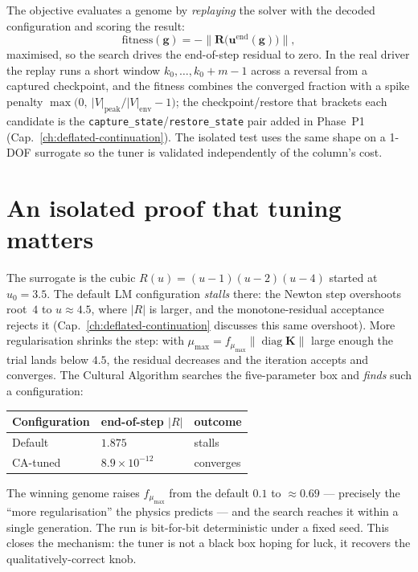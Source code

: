 The objective evaluates a genome by \emph{replaying} the solver with the
decoded configuration and scoring the result:
\[
  \text{fitness}(\mathbf{g})
  = -\bigl\lVert\mathbf{R}\bigl(\mathbf{u}^{\text{end}}(\mathbf{g})\bigr)\bigr\rVert,
\]
maximised, so the search drives the end-of-step residual to zero. In the
real driver the replay runs a short window \(k_0,\dots,k_0{+}m{-}1\) across
a reversal from a captured checkpoint, and the fitness combines the
converged fraction with a spike penalty
\(\max\!\bigl(0,\ |V|_{\text{peak}}/|V|_{\text{env}}-1\bigr)\); the
checkpoint/restore that brackets each candidate is the
\texttt{capture\_state}/\texttt{restore\_state} pair added in Phase~P1
(Cap.~\ref{ch:deflated-continuation}). The isolated test uses the same
shape on a 1-DOF surrogate so the tuner is validated independently of the
column's cost.

\section{An isolated proof that tuning matters}

The surrogate is the cubic \(R(u)=(u-1)(u-2)(u-4)\) started at
\(u_0=3.5\). The default LM configuration \emph{stalls} there: the Newton
step overshoots root~\(4\) to \(u\approx4.5\), where \(|R|\) is larger,
and the monotone-residual acceptance rejects it
(Cap.~\ref{ch:deflated-continuation} discusses this same overshoot). More
regularisation shrinks the step: with \(\mu_{\max}=f_{\mu_{\max}}\lVert
\operatorname{diag}\mathbf{K}\rVert\) large enough the trial lands below
\(4.5\), the residual decreases and the iteration accepts and converges.
The Cultural Algorithm searches the five-parameter box and \emph{finds}
such a configuration:
%
\begin{center}
\begin{tabular}{@{}lll@{}}
\toprule
Configuration        & end-of-step \(|R|\)          & outcome \\
\midrule
Default              & \(1.875\)                    & stalls \\
CA-tuned             & \(8.9\times10^{-12}\)        & converges \\
\bottomrule
\end{tabular}
\end{center}
%
The winning genome raises \(f_{\mu_{\max}}\) from the default \(0.1\) to
\(\approx0.69\) --- precisely the ``more regularisation'' the physics
predicts --- and the search reaches it within a single generation. The
run is bit-for-bit deterministic under a fixed seed. This closes the
mechanism: the tuner is not a black box hoping for luck, it recovers the
qualitatively-correct knob.

